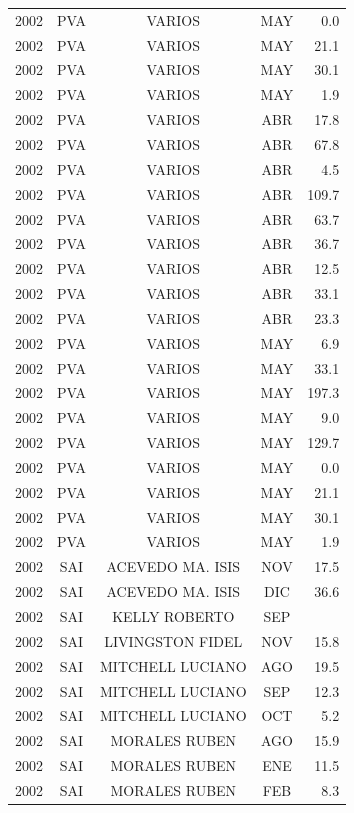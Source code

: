 \documentclass[12pt,]{article}
\begin{document}
\begin{table}[ht]
{\begin{tabular}{lcccr}
  2002 & PVA & VARIOS & MAY & 0.0 \\ 
  2002 & PVA & VARIOS & MAY & 21.1 \\ 
  2002 & PVA & VARIOS & MAY & 30.1 \\ 
  2002 & PVA & VARIOS & MAY & 1.9 \\ 
  2002 & PVA & VARIOS & ABR & 17.8 \\ 
  2002 & PVA & VARIOS & ABR & 67.8 \\ 
  2002 & PVA & VARIOS & ABR & 4.5 \\ 
  2002 & PVA & VARIOS & ABR & 109.7 \\ 
  2002 & PVA & VARIOS & ABR & 63.7 \\ 
  2002 & PVA & VARIOS & ABR & 36.7 \\ 
  2002 & PVA & VARIOS & ABR & 12.5 \\ 
  2002 & PVA & VARIOS & ABR & 33.1 \\ 
  2002 & PVA & VARIOS & ABR & 23.3 \\ 
  2002 & PVA & VARIOS & MAY & 6.9 \\ 
  2002 & PVA & VARIOS & MAY & 33.1 \\ 
  2002 & PVA & VARIOS & MAY & 197.3 \\ 
  2002 & PVA & VARIOS & MAY & 9.0 \\ 
  2002 & PVA & VARIOS & MAY & 129.7 \\ 
  2002 & PVA & VARIOS & MAY & 0.0 \\ 
  2002 & PVA & VARIOS & MAY & 21.1 \\ 
  2002 & PVA & VARIOS & MAY & 30.1 \\ 
  2002 & PVA & VARIOS & MAY & 1.9 \\ 
  2002 & SAI & ACEVEDO MA. ISIS & NOV & 17.5 \\ 
  2002 & SAI & ACEVEDO MA. ISIS & DIC & 36.6 \\ 
  2002 & SAI & KELLY ROBERTO & SEP &  \\ 
  2002 & SAI & LIVINGSTON FIDEL & NOV & 15.8 \\ 
  2002 & SAI & MITCHELL LUCIANO & AGO & 19.5 \\ 
  2002 & SAI & MITCHELL LUCIANO & SEP & 12.3 \\ 
  2002 & SAI & MITCHELL LUCIANO & OCT & 5.2 \\ 
  2002 & SAI & MORALES RUBEN & AGO & 15.9 \\ 
  2002 & SAI & MORALES RUBEN & ENE & 11.5 \\ 
  2002 & SAI & MORALES RUBEN & FEB & 8.3 \\ 

\end{tabular}}
\end{table}
\end{document}
